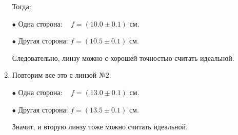 \documentclass[12pt,a4paper]{article}
\begin{document}
\begin{enumerate}
		\vspace{5mm}
		Тогда:
		
		$\bullet$ Одна сторона: $\;\;\; f = (10.0 \pm 0.1)$ см.
		
		$\bullet$ Другая сторона: $f = (10.5 \pm 0.1)$ см.
		
		Следовательно, линзу можно с хорошей точностью считать идеальной.
		
		\item Повторим все это с линзой №2:
		
		$\bullet$ Одна сторона: $\;\;\; f = (13.0 \pm 0.1)$ см.
		
		$\bullet$ Другая сторона: $f = (13.5 \pm 0.1)$ см.
		
		Значит, и вторую линзу тоже можно считать идеальной.
	
	\end{enumerate}
\end{document}
